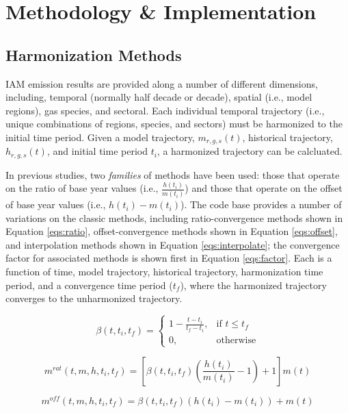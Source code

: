 
\section{Methodology \& Implementation}

\subsection{Harmonization Methods}

IAM emission results are provided along a number of different dimensions,
including, temporal (normally half decade or decade), spatial (i.e., model
regions), gas species, and sectoral. Each individual temporal trajectory (i.e.,
unique combinations of regions, species, and sectors) must be harmonized to the
initial time period. Given a model trajectory, $m_{r, g, s}(t)$, historical
trajectory, $h_{r, g, s}(t)$, and initial time period $t_i$, a harmonized
trajectory can be calcluated.

In previous studies, two \textit{families} of methods have been used: those that
operate on the ratio of base year values (i.e., $\frac{h(t_i)}{m(t_i)}$) and
those that operate on the offset of base year values (i.e., $h(t_i) -
m(t_i)$). The  code base provides a number of variations on the
classic methods, including ratio-convergence methods shown in Equation
\ref{eqs:ratio}, offset-convergence methods shown in Equation \ref{eqs:offset},
and interpolation methods shown in Equation \ref{eqs:interpolate}; the
convergence factor for associated methods is shown first in Equation
\ref{eqs:factor}. Each is a function of time, model trajectory, historical
trajectory, harmonization time period, and a convergence time period ($t_f$),
where the harmonized trajectory converges to the unharmonized trajectory.

\begin{equation}\label{eqs:factor}
  \beta(t, t_i, t_f) =
  \begin{cases}
    1 - \frac{t - t_i}{t_f - t_i},& \text{if } t \leq t_f\\
    0,                        & \text{otherwise}
  \end{cases}
\end{equation}

\begin{equation}\label{eqs:ratio}
  m^{rat}(t, m, h, t_i, t_f) = [\beta(t, t_i, t_f) (\frac{h(t_i)}{m(t_i)} - 1) + 1] m(t)
\end{equation}

\begin{equation}\label{eqs:offset}
  m^{off}(t, m, h, t_i, t_f) = \beta(t, t_i, t_f) (h(t_i) - m(t_i)) + m(t)
\end{equation}
  
